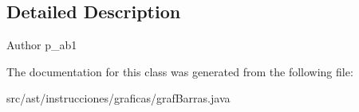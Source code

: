 \subsection{Detailed Description}
\begin{DoxyAuthor}{Author}
p\+\_\+ab1 
\end{DoxyAuthor}


The documentation for this class was generated from the following file\+:\begin{DoxyCompactItemize}
\item 
src/ast/instrucciones/graficas/graf\+Barras.\+java\end{DoxyCompactItemize}
